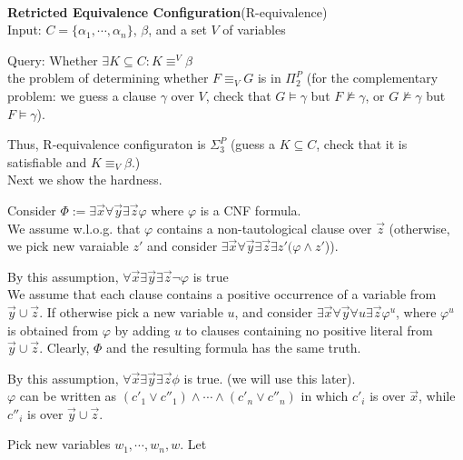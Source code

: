 \documentclass[12pt]{article}
\begin{document}
\ \\

{\bf Retricted Equivalence Configuration}(R-equivalence)\\

Input: $C=\{\alpha_1,\cdots,\alpha_n\}$, $\beta$, and a set $V$ of variables

Query: Whether $\exists K\subseteq C: K\equiv^V \beta$\\ 



the problem of determining whether $F\equiv_V G$  is in $\Pi_2^P$ (for the complementary problem: we guess a clause $\gamma$ over $V$, check that $G\models \gamma$ but $F\not\models \gamma$, or $G\not\models\gamma$ but $F\models\gamma$). 

Thus, R-equivalence configuraton is $\Sigma_3^P$ (guess a $K\subseteq C$, check that it is satisfiable and $K\equiv_V \beta$.) \\


Next we show the hardness.

Consider $\Phi:=\exists \vec{x}\forall\vec{y}\exists \vec{z} \varphi$ where $\varphi$ is a CNF formula. \\

We assume w.l.o.g. that $\varphi$ contains a non-tautological clause over $\vec{z}$ (otherwise, we pick new varaiable $z'$ and consider $\exists\vec{x}\forall\vec{y}\exists\vec{z}\exists z'(\varphi\wedge z'$)).

By this assumption, $\forall\vec{x}\exists\vec{y}\exists\vec{z}\neg \varphi$ is true\\

We assume that each clause contains a positive occurrence of a variable from $\vec{y}\cup\vec{z}$. If otherwise pick a new variable $u$, and consider $\exists \vec{x}\forall\vec{y}\forall u\exists \vec{z}\varphi^u$, where $\varphi^u$ is obtained from $\varphi$ by adding $u$ to clauses containing no positive literal from $\vec{y}\cup\vec{z}$. Clearly, $\Phi$ and the resulting formula has the same truth.

By this assumption, $\forall\vec{x}\exists\vec{y}\exists\vec{z}\phi$ is true. (we will use this later).\\ 

$\varphi$ can be written as $(c'_1\vee c''_1)\wedge\cdots\wedge (c'_n\vee c''_n)$ in which $c'_i$ is over $\vec{x}$, while $c''_i$ is over $\vec{y}\cup\vec{z}$.

Pick new variables $w_1, \cdots, w_n,w$. Let 
\end{document}
